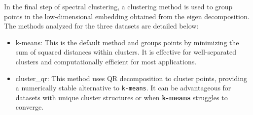 In the final step of spectral clustering, a clustering method is used to group points in the low-dimensional embedding
 obtained from the eigen decomposition. The methods analyzed for the three datasets are detailed below:
 \begin{itemize}
    \item k-means: This is the default method and groups points by minimizing the sum of squared distances within clusters. It is effective for well-separated clusters and computationally efficient for most applications.
    \item cluster\_qr: This method uses QR decomposition to cluster points, providing a numerically stable alternative to 
    \texttt{k-means}. It can be advantageous for datasets with unique cluster structures or when \textbf{k-means} struggles to
     converge.
\end{itemize}
